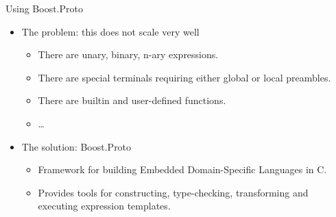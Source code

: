 \documentclass[@BEAMER_OPTIONS@]{beamer}
\newcommand{\CXX}{{\rm C}\plusplus}
\begin{document}
\note{ }

\begin{frame}{Using Boost.Proto}
    \begin{itemize}
        \item The problem: this does not scale very well
            \begin{itemize}
                \item There are unary, binary, n-ary expressions.
                \item There are special terminals requiring either global or
                    local preambles.
                \item There are builtin and user-defined functions.
                \item \ldots
            \end{itemize}
        \item The solution: Boost.Proto
            \begin{itemize}
                \item Framework for building Embedded Domain-Specific
                    Languages in \CXX.
                \item Provides tools for constructing, type-checking,
                    transforming and executing expression templates.
            \end{itemize}
    \end{itemize}
\end{frame}
\end{document}
